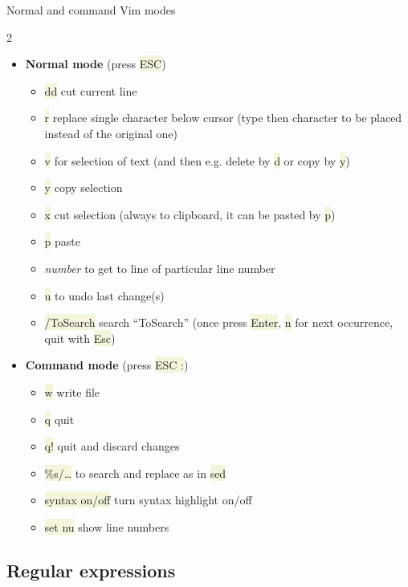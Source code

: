 \documentclass[compress, xelatex, 11pt, xcolor=svgnames, aspectratio=169, url={hyphens, lowtilde}]{beamer}
\renewcommand{\texttt}[1]{\colorbox{Beige}{{\ttfamily #1}}}
\begin{document}
\begin{frame}{Normal and command Vim modes}
	\begin{multicols}{2}
		\begin{itemize}
			\item \textbf{Normal mode} (press \texttt{ESC})
			\begin{itemize}
				\item \texttt{dd} cut current line
				\item \texttt{r} replace single character below cursor (type then character to be placed instead of the original one)
				\item \texttt{v} for selection of text (and then e.g. delete by \texttt{d} or copy by \texttt{y})
				\item \texttt{y} copy selection
				\item \texttt{x} cut selection (always to clipboard, it can be pasted by \texttt{p})
				\item \texttt{p} paste
				\item \textit{number} to get to line of particular line number
				\item \texttt{u} to undo last change(s)
				\item \texttt{/ToSearch} search \enquote{ToSearch} (once press \texttt{Enter}, \texttt{n} for next occurrence, quit with \texttt{Esc})
			\end{itemize}
			\item \textbf{Command mode} (press \texttt{ESC :})
			\begin{itemize}
				\item \texttt{w} write file
				\item \texttt{q} quit
				\item \texttt{q!} quit and discard changes
				\item \texttt{\%s/\ldots} to search and replace as in \texttt{sed}
				\item \texttt{syntax on/off} turn syntax highlight on/off
				\item \texttt{set nu} show line numbers
			\end{itemize}
		\end{itemize}
	\end{multicols}
\end{frame}

\subsection{Regular expressions}
\end{document}
